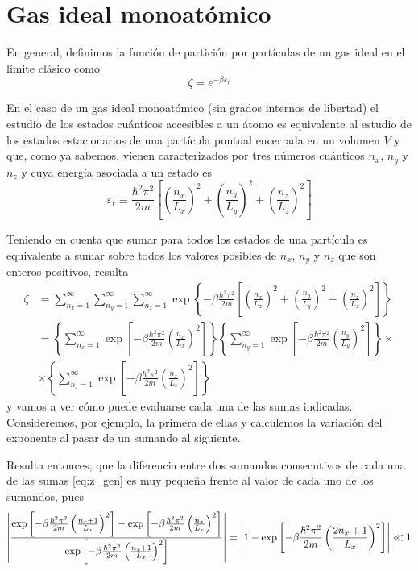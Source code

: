 \section{Gas ideal monoatómico}
En general, definimos la función de partición por partículas de un gas ideal en el límite clásico como
\begin{equation}\label{eq:zeta_lim}
	\zeta = e^{-\beta\varepsilon_r}
\end{equation}

En el caso de un gas ideal monoatómico (sin grados internos de libertad) el estudio de los estados cuánticos accesibles a un átomo es equivalente al estudio de los estados estacionarios de una partícula puntual encerrada en un volumen $V$ y que, como ya sabemos, vienen caracterizados por tres números cuánticos $n_x$, $n_y$ y $n_z$ y cuya energía asociada a un estado es
\begin{equation}
\varepsilon_r \equiv \frac{\hbar^2 \pi^2}{2m} \left[\left( \frac{n_x}{L_x} \right)^2 + \left( \frac{n_y}{L_y} \right)^2 + \left( \frac{n_z}{L_z} \right)^2 \right] 
\end{equation}

Teniendo en cuenta que sumar para todos los estados de una partícula es equivalente a sumar sobre todos los valores posibles de $n_x$, $n_y$ y $n_z$ que son enteros positivos, resulta
\begin{align}\label{eq:z_gen}
	\zeta &= \sum_{n_x=1}^{\infty} \sum_{n_y=1}^{\infty} \sum_{n_z=1}^{\infty} \exp \left\lbrace - \beta \frac{\hbar^2 \pi^2}{2m} \left[\left( \frac{n_x}{L_x} \right)^2 + \left( \frac{n_y}{L_y} \right)^2 + \left( \frac{n_z}{L_z} \right)^2 \right]  \right\rbrace \nonumber \\
		&= \left\lbrace \sum_{n_x=1}^{\infty} \exp \left[ -\beta \frac{\hbar^2 \pi^2}{2m} \left( \frac{n_x}{L_x} \right)^2 \right] \right\rbrace \left\lbrace \sum_{n_y=1}^{\infty} \exp \left[ -\beta \frac{\hbar^2 \pi^2}{2m} \left( \frac{n_y}{L_y} \right)^2 \right] \right\rbrace \times \\
		&\times \left\lbrace \sum_{n_z=1}^{\infty} \exp \left[ -\beta \frac{\hbar^2 \pi^2}{2m} \left( \frac{n_z}{L_z} \right)^2 \right] \right\rbrace \nonumber
\end{align}
y vamos a ver cómo puede evaluarse cada una de las sumas indicadas.
Consideremos, por ejemplo, la primera de ellas y calculemos la variación del exponente al pasar de un sumando al siguiente.

Resulta entonces, que la diferencia entre dos sumandos consecutivos de cada una de las sumas \eqref{eq:z_gen} es muy pequeña frente al valor de cada uno de los sumandos, pues
\begin{equation}
	\abs{\frac{\exp \left[ -\beta \frac{\hbar^2 \pi^2}{2m} \left( \frac{n_x + 1}{L_x} \right)^2 \right] - \exp \left[ -\beta \frac{\hbar^2 \pi^2}{2m} \left( \frac{n_x}{L_x} \right)^2 \right]}{\exp \left[ -\beta \frac{\hbar^2 \pi^2}{2m} \left( \frac{n_x + 1}{L_x} \right)^2 \right]}} = \abs{1 - \exp \left[ -\beta \frac{\hbar^2 \pi^2}{2m} \left( \frac{2n_x + 1}{L_x} \right)^2 \right]} \ll 1
\end{equation}


